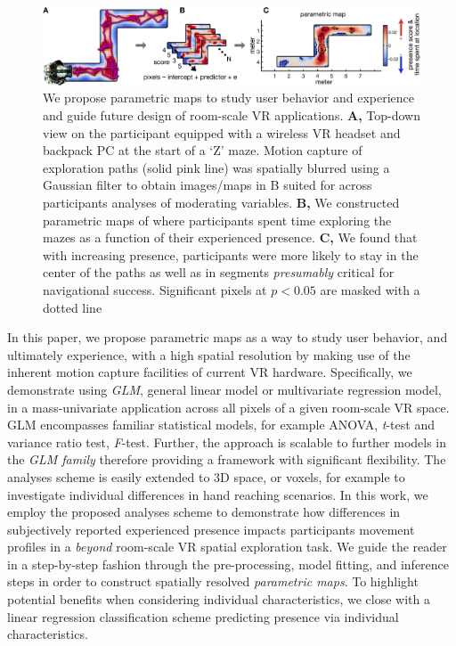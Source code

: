 \begin{figure}[!ht]
\centering
\includegraphics[width=\linewidth]{figures/fig1.pdf}
\vspace{6pt}
\caption{We propose parametric maps to study user behavior and experience and guide future design of room-scale VR applications. \textbf{A,} Top-down view on the participant equipped with a wireless VR headset and backpack PC at the start of a `Z' maze. Motion capture of exploration paths (solid pink line) was spatially blurred using a Gaussian filter to obtain images/maps in B suited for across participants analyses of moderating variables. \textbf{B,} We constructed parametric maps of where participants spent time exploring the mazes as a function of their experienced presence. \textbf{C,} We found that with increasing presence, participants were more likely to stay in the center of the paths as well as in segments \textit{presumably} critical for navigational success. Significant pixels at $p<0.05$ are masked with a dotted line}
\label{fig:methods}
\end{figure}

In this paper, we propose parametric maps as a way to study user behavior, and ultimately experience, with a high spatial resolution by making use of the inherent motion capture facilities of current VR hardware. Specifically, we demonstrate using \textit{GLM}, general linear model or multivariate regression model, in a mass-univariate application across all pixels of a given room-scale VR space. GLM encompasses familiar statistical models, for example ANOVA, \textit{t}-test and variance ratio test, \textit{F}-test. Further, the approach is scalable to further models in the \textit{GLM family} therefore providing a framework with significant flexibility. The analyses scheme is easily extended to 3D space, or voxels, for example to investigate individual differences in hand reaching scenarios. In this work, we employ the proposed analyses scheme to demonstrate how differences in subjectively reported experienced presence impacts participants movement profiles in a \textit{beyond} room-scale VR spatial exploration task. We guide the reader in a step-by-step fashion through the pre-processing, model fitting, and inference steps in order to construct spatially resolved \textit{parametric maps}. To highlight potential benefits when considering individual characteristics, we close with a linear regression classification scheme predicting presence via individual characteristics.